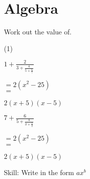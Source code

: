 \chapter{Algebra}

\clearpage


\clearpage
\noindent Work out the value of.
\begin{tasks}(1)
    \task \begin{exercise}$ 1+ \frac{2}{3+\frac{4}{5+\frac{6}{7} }} $
              \begin{envSolution}
                 $ =2(x^2-25)   $\\ 
                 $ =$			 
                     \begin{shortsolution}
  	                    $ 2(x+5)(x-5)$
                     \end{shortsolution}
              \end{envSolution}%
          \end{exercise}
 
    \task \begin{exercise}$7+ \frac{6}{5+\frac{4}{3+\frac{1}{2} } } $
              \begin{envSolution}
                 $ =2(x^2-25)   $\\ 
                 $ =$			 
                     \begin{shortsolution}
  	                    $ 2(x+5)(x-5)$
                     \end{shortsolution}
              \end{envSolution}%
          \end{exercise}
 
\end{tasks}







\begin{bxTip}[colbacktitle=green]{Skill: Write in the form $ax^b$}

\end{bxTip}


